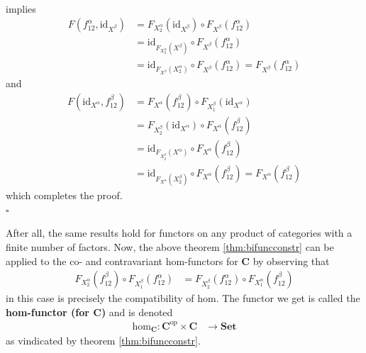\begin{prf}
\begin{align*}
\end{align*}
implies
\begin{align*}
  F(f_{12}^{\alpha},\mathrm{id}_{X^{\beta}})
  &=
  F_{X_{2}^{\alpha}}(\mathrm{id}_{X^{\beta}})
  \circ
  F_{X^{\beta}}(f_{12}^{\alpha})
  \\
  &=
  \mathrm{id}_{F_{X_{2}^{\alpha}}(X^{\beta})}
  \circ
  F_{X^{\beta}}(f_{12}^{\alpha})
  \\
  &=
  \mathrm{id}_{F_{X^{\beta}}(X_{2}^{\alpha})}
  \circ
  F_{X^{\beta}}(f_{12}^{\alpha})
  =
  F_{X^{\beta}}(f_{12}^{\alpha})
\end{align*}
and
\begin{align*}
  F(\mathrm{id}_{X^{\alpha}},f_{12}^{\beta})
  &=
  F_{X^{\alpha}}(f_{12}^{\beta})
  \circ
  F_{X_{1}^{\beta}}(\mathrm{id}_{X^{\alpha}})
  \\
  &=
  F_{X_{2}^{\beta}}(\mathrm{id}_{X^{\alpha}})
  \circ
  F_{X^{\alpha}}(f_{12}^{\beta})
  \\
  &=
  \mathrm{id}_{F_{X_{2}^{\beta}}(X^{\alpha})}
  \circ
  F_{X^{\alpha}}(f_{12}^{\beta})
  \\
  &=
  \mathrm{id}_{F_{X^{\alpha}}(X_{2}^{\beta})}
  \circ
  F_{X^{\alpha}}(f_{12}^{\beta})
  =
  F_{X^{\alpha}}(f_{12}^{\beta})
\end{align*}
which completes the proof.
\\
\phantom{proven}
\hfill
$\square$
\end{prf}
After all, the same results hold for functors on any product of categories with a finite number of factors.
Now, the above theorem \ref{thm:bifuncconstr} can be applied to the co- and contravariant hom-functors for $\mathbf{C}$ by observing that
\begin{align*}
  F_{X_{2}^{\alpha}}(f_{12}^{\beta})
  \circ
  F_{X_{1}^{\beta}}(f_{12}^{\alpha})
  &=
  F_{X_{2}^{\beta}}(f_{12}^{\alpha})
  \circ
  F_{X_{1}^{\alpha}}(f_{12}^{\beta})
\end{align*}
in this case is precisely the compatibility of hom.
The functor we get is called the \textbf{hom-functor (for $\mathbf{C}$)} and is denoted
\begin{align*}
  \mathrm{hom}_{\mathbf{C}}
  \colon
  \mathbf{C}^{\mathrm{op}}
  \times
  \mathbf{C}
  &\rightarrow
  \mathbf{Set}
\end{align*}
as vindicated by theorem \ref{thm:bifuncconstr}.
